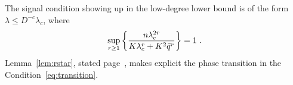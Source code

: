 \documentclass[final]{colt2026}
\newcommand{\1}{\mathbf{1}}
\newcommand{\pa}[1]{\left(#1\right)}
\newcommand{\ac}[1]{\left\{#1\right\}}
\begin{document}
The signal condition showing up in the low-degree lower bound is of the form $\lambda\leq D^{-c}\lambda_{c}$, where
\begin{equation}\label{eq:transition}
\sup_{r\geq 1} \ac{n\lambda_{c}^{2r}\over K \lambda_{c}^r+K^2 \bar q^r} = 1\ .
\end{equation}
Lemma~\ref{lem:rstar}, stated  page~\pageref{lem:rstar}, makes explicit the phase transition in the Condition~\eqref{eq:transition}. 


\bigskip

\end{document}
